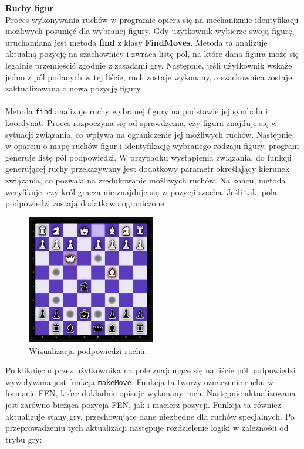 \documentclass[12pt,a4paper]{article}
\begin{document}
\newpage

\noindent \textbf{Ruchy figur}\\
Proces wykonywania ruchów w programie opiera się na mechanizmie identyfikacji możliwych posunięć dla wybranej figury. Gdy użytkownik wybierze swoją figurę, uruchamiana jest metoda \textbf{find} z klasy \textbf{FindMoves}. Metoda ta analizuje aktualną pozycję na szachownicy i zwraca listę pól, na które dana figura może się legalnie przemieścić zgodnie z zasadami gry. Następnie, jeśli użytkownik wskaże jedno z pól podanych w tej liście, ruch zostaje wykonany, a szachownica zostaje zaktualizowana o nową pozycję figury. 
\\\\
Metoda \texttt{find} analizuje ruchy wybranej figury na podstawie jej symbolu i koordynat. Proces rozpoczyna się od sprawdzenia, czy figura znajduje się w sytuacji związania, co wpływa na ograniczenie jej możliwych ruchów. Następnie, w oparciu o mapę ruchów figur i identyfikację wybranego rodzaju figury, program generuje listę pól podpowiedzi. W przypadku wystąpienia związania, do funkcji generującej ruchy przekazywany jest dodatkowy parametr określający kierunek związania, co pozwala na zredukowanie możliwych ruchów. Na końcu, metoda weryfikuje, czy król gracza nie znajduje się w pozycji szacha. Jeśli tak, pola podpowiedzi zostają dodatkowo ograniczone.

\vspace{0.5cm}
\begin{figure}[h!]
    \centering
    \includegraphics[width=0.5\textwidth]{images/imp_move_tips.png}
    \caption{Wizualizacja podpowiedzi ruchu.}
\end{figure}
\vspace{0.5cm}

\noindent
Po kliknięciu przez użytkownika na pole znajdujące się na liście pól podpowiedzi wywoływana jest funkcja \texttt{makeMove}. Funkcja ta tworzy oznaczenie ruchu w formacie FEN, które dokładnie opisuje wykonany ruch. Następnie aktualizowana jest zarówno bieżąca pozycja FEN, jak i macierz pozycji. Funkcja ta również aktualizuje stany gry, przechowujące dane niezbędne dla ruchów specjalnych. Po przeprowadzeniu tych aktualizacji następuje rozdzielenie logiki w zależności od trybu gry:
\end{document}
